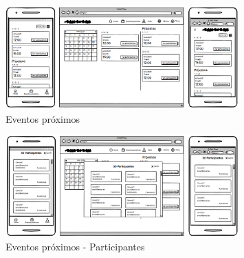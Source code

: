 \begin{figure}[H]
	\centering
	\includegraphics[width=0.8\textwidth]{5-AnalisisDelSistemaDeInformacion/InterfacesDeUsuario/EventosProximos/eventos proximos.png}
	\caption{Eventos próximos}
\end{figure}

\begin{figure}[H]
	\centering
	\includegraphics[width=0.8\textwidth]{5-AnalisisDelSistemaDeInformacion/InterfacesDeUsuario/EventosProximos/eventos proximos participantes.png}
	\caption{Eventos próximos - Participantes}
\end{figure}
